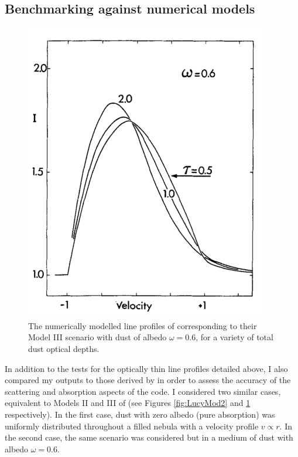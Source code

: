 \subsection{Benchmarking against numerical models}
\label{opt_thick_testing}
\begin{figure}
\centering
\includegraphics[trim =0 0 0 0,clip=true,scale=0.6]{chapters/chapter4/images/Lucy89_Model3.png}
\caption{The numerically modelled line profiles of \citet{Lucy1989} corresponding to their Model III scenario with dust of albedo $\omega=0.6$, for a variety of total dust optical depths.}
\label{fig:LucyMod3}
\end{figure}



In addition to the tests for the optically thin line profiles detailed above, I also compared my outputs to those derived by \citet{Lucy1989} in order to assess the accuracy of the scattering and absorption aspects of the code.  
I  considered two similar cases, equivalent to Models II and III of 
\citet{Lucy1989} (see Figures \ref{fig:LucyMod2} and \ref{fig:LucyMod3} respectively). In the first case, dust with zero albedo (pure absorption) was 
uniformly distributed throughout a filled nebula with a velocity profile 
$v \propto r$.  In the second case, the same scenario was considered but in a 
medium of dust with albedo $\omega =0.6$.

